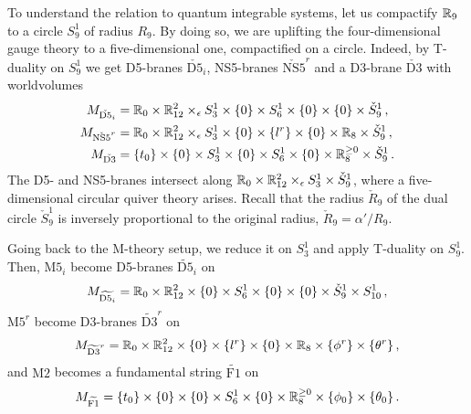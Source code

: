 To understand the relation to quantum integrable systems, let us
compactify $\mathbb{R}_9$ to a circle $S^1_9$ of radius $R_9$.  By doing so,
we are uplifting the four-dimensional gauge theory to a
five-dimensional one, compactified on a circle.  Indeed, by T-duality
on $S^1_9$ we get D5-branes $\check{\mathrm{D5}}_i$, NS5-branes
$\check{\mathrm{NS5}}^r$ and a D3-brane $\check{\mathrm{D3}}$ with
worldvolumes
\begin{align}
  \label{ea:M-D5}
  M_{\check{\mathrm{D5}}_i}
  &=
  \mathbb{R}_0 \times \mathbb{R}^2_{12} \times_\epsilon S^1_3 \times \{0\}
  \times S^1_6 \times \{0\} \times \{0\} \times \check S^1_9 \,,
  \\
  \label{ea:M-NS5}
  M_{\check{\mathrm{NS5}}^r}
  &=
  \mathbb{R}_0 \times \mathbb{R}^2_{12} \times_\epsilon S^1_3 \times \{0\}
  \times \{l^r\} \times \{0\} \times \mathbb{R}_8 \times \check S^1_9 \,,
  \\
  \label{ea:M-D3}
  M_{\check{\mathrm{D3}}}
  &=
  \{t_0\} \times \{0\} \times S^1_3 \times \{0\}
  \times S^1_6 \times \{0\} \times \mathbb{R}^{\geq0}_8
  \times \check S^1_9 \,.
\end{align}
The D5- and NS5-branes intersect along
$\mathbb{R}_0 \times \mathbb{R}^2_{12} \times_\epsilon S^1_3 \times \check S^1_9$, where a
five-dimensional circular quiver theory arises.  Recall that the
radius $\check{R}_9$ of the dual circle $\check{S}^1_9$ is inversely
proportional to the original radius, $\check{R}_9 = \alpha'/R_9$.

Going back to the M-theory setup, we reduce it on $S^1_3$ and apply
T-duality on $S^1_9$.  Then, $\mathrm{M5}_i$ become D5-branes
$\widetilde{\mathrm{D5}}_i$ on
\begin{equation}
  M_{\widetilde{\mathrm{D5}_i}}
  =
  \mathbb{R}_0 \times \mathbb{R}^2_{12} \times \{0\} \times S^1_6
  \times \{0\} \times \{0\} \times \check{S}^1_9 \times S^1_{10} \,,
\end{equation}
$\mathrm{M5}^r$ become D3-branes $\widetilde{\mathrm{D3}}^r$ on
\begin{equation}
  M_{\widetilde{\mathrm{D3}}^r}
  =
  \mathbb{R}_0 \times \mathbb{R}^2_{12} \times \{0\} \times \{l^r\}
  \times \{0\} \times \mathbb{R}_8 \times \{\phi^r\} \times \{\theta^r\} \,,
\end{equation}
and $\mathrm{M2}$ becomes a fundamental string $\widetilde{\mathrm{F1}}$ on
\begin{equation}
  M_{\widetilde{\mathrm{F1}}}
  =
  \{t_0\} \times \{0\} \times \{0\}
  \times S^1_6 \times \{0\} \times \mathbb{R}^{\geq0}_8
  \times \{\phi_0\} \times \{\theta_0\} \,.
\end{equation}






